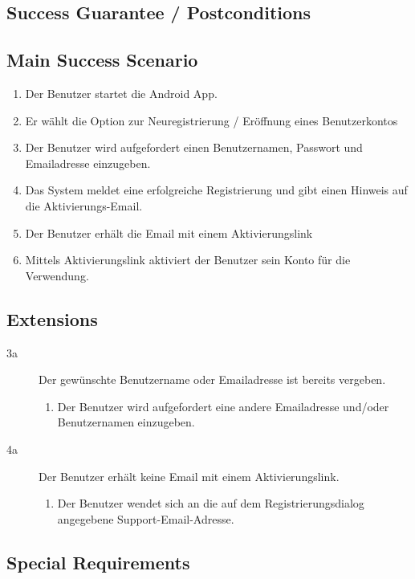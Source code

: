 \documentclass[10pt,a4paper]{scrartcl}
\begin{document}
\subsection*{Success Guarantee / Postconditions}


\subsection*{Main Success Scenario}

\begin{enumerate}
\item Der Benutzer startet die Android App.
\item Er wählt die Option zur Neuregistrierung / Eröffnung eines Benutzerkontos
\item Der Benutzer wird aufgefordert einen Benutzernamen, Passwort und Emailadresse einzugeben.
\item Das System meldet eine erfolgreiche Registrierung und gibt einen Hinweis auf die Aktivierungs-Email.
\item Der Benutzer erhält die Email mit einem Aktivierungslink
\item Mittels Aktivierungslink aktiviert der Benutzer sein Konto für die Verwendung. 
\end{enumerate}


\subsection*{Extensions}

\begin{description}
\item[3a] Der gewünschte Benutzername oder Emailadresse ist bereits vergeben.
	\begin{enumerate}
	\item Der Benutzer wird aufgefordert eine andere Emailadresse und/oder Benutzernamen 		einzugeben.
	\end{enumerate}
\item[4a] Der Benutzer erhält keine Email mit einem Aktivierungslink.
	\begin{enumerate}
	\item Der Benutzer wendet sich an die auf dem Registrierungsdialog angegebene Support-Email-Adresse.
	\end{enumerate}

\end{description}


\subsection*{Special Requirements}
\end{document}
